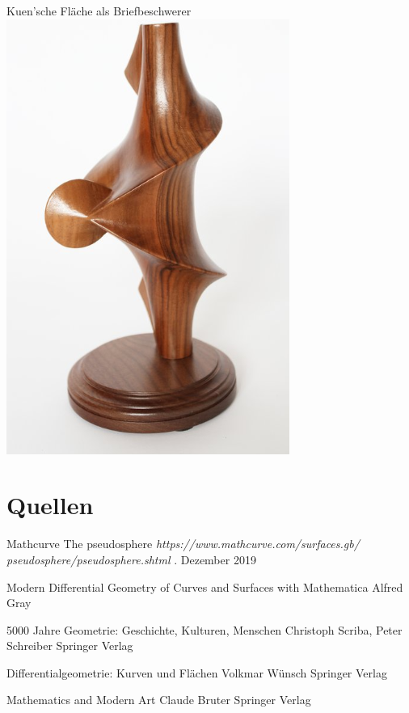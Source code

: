 \documentclass[12pt]{beamer}
\begin{document}
\begin{frame}{Kuen'sche Fläche als Briefbeschwerer}
\centering
\includegraphics[scale=0.5]{kuen_letter.png}
\end{frame}

\section{Quellen}
\begin{frame}
\footnotesize{
\begin{thebibliography}{99}

 Mathcurve
\newblock The pseudosphere
\newblock \emph{https://www.mathcurve.com/surfaces.gb/\\pseudosphere/pseudosphere.shtml}
. Dezember 2019

 Modern Differential Geometry of Curves and Surfaces with Mathematica
\newblock Alfred Gray

\end{thebibliography}
}

\end{frame}

\begin{frame}
\footnotesize{
\begin{thebibliography}{99}

 5000 Jahre Geometrie: Geschichte, Kulturen, Menschen
\newblock Christoph Scriba, Peter Schreiber
\newblock Springer Verlag

 Differentialgeometrie: Kurven und Flächen
\newblock Volkmar Wünsch
\newblock Springer Verlag

\end{thebibliography}
}
\end{frame}

\begin{frame}
\footnotesize{
\begin{thebibliography}{99}

 Mathematics and Modern Art
\newblock Claude Bruter
\newblock Springer Verlag

\end{thebibliography}
}
\end{frame}
\end{document}
